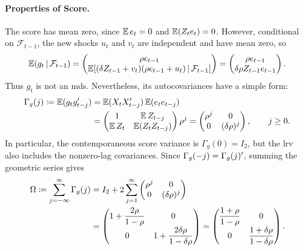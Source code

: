 \documentclass[a4paper,12pt]{article}
\begin{document}
\paragraph{Properties of Score.}
The score has mean zero, since $\operatorname{\mathbb{E}} e_t=0$ and $\operatorname{\mathbb{E}}(Z_te_t)=0$.
However, conditional on $\mathcal F_{t-1}$, the new shocks $u_t$ and $v_t$ are independent and have mean zero, so
\begin{align}
	\operatorname{\mathbb{E}}(g_t\mathpunct{}|\mathpunct{}\mathcal F_{t-1})
	=
	\begin{pmatrix}
		\rho e_{t-1}\\
		\operatorname{\mathbb{E}}[(\delta Z_{t-1}+v_t)(\rho e_{t-1}+u_t)\mathpunct{}|\mathpunct{}\mathcal F_{t-1}]
	\end{pmatrix}
	=
	\begin{pmatrix}
		\rho e_{t-1}\\
		\delta\rho Z_{t-1}e_{t-1}
	\end{pmatrix}.
\end{align}
Thus $g_t$ is not an \gls{mds}.
Nevertheless, its autocovariances have a simple form:
\begin{align}
	\Gamma_g(j)
	\coloneqq\operatorname{\mathbb{E}}(g_tg_{t-j}^{\prime})
	&=\operatorname{\mathbb{E}}(X_tX_{t-j}^{\prime})\operatorname{\mathbb{E}}(e_te_{t-j})\notag\\
	&=\begin{pmatrix}1&\operatorname{\mathbb{E}} Z_{t-j}\\\operatorname{\mathbb{E}} Z_t&\operatorname{\mathbb{E}}(Z_tZ_{t-j})\end{pmatrix}\rho^j
	=\begin{pmatrix}\rho^j&0\\0&(\delta\rho)^j\end{pmatrix},\qquad j\ge0.
\end{align}
In particular, the contemporaneous score variance is $\Gamma_g(0)=I_2$,
but the \gls{lrv} also includes the nonzero-lag covariances.
Since $\Gamma_g(-j)=\Gamma_g(j)^{\prime}$, summing the geometric series gives
\begin{align}
	\Omega
	\coloneqq\sum_{j=-\infty}^{\infty}\Gamma_g(j)
	&=I_2+2\sum_{j=1}^{\infty}\begin{pmatrix}\rho^j&0\\0&(\delta\rho)^j\end{pmatrix}\notag\\
	&=\begin{pmatrix}
		1+\dfrac{2\rho}{1-\rho}&0\\[6pt]
		0&1+\dfrac{2\delta\rho}{1-\delta\rho}
	\end{pmatrix}
	=\begin{pmatrix}
		\dfrac{1+\rho}{1-\rho}&0\\[6pt]
		0&\dfrac{1+\delta\rho}{1-\delta\rho}
	\end{pmatrix}.
\end{align}
\end{document}
